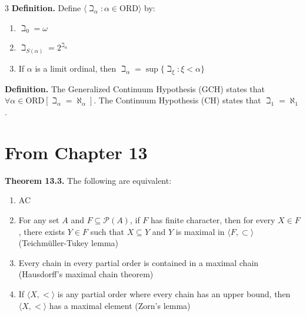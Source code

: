 \documentclass[landscape,8pt]{article}
\newcommand{\Pow}{\mathcal{P}}
\begin{document}
\begin{multicols}{3}
	\noindent\textbf{Definition.} Define $\langle \beth_\alpha : \alpha \in \text{ORD} \rangle$ by:
	\begin{enumerate}[noitemsep,topsep=0pt]
		\item $\beth_0 = \omega$
		\item $\beth_{S(\alpha)} = 2^{\beth_\alpha}$
		\item If $\alpha$ is a limit ordinal, then $\beth_\alpha = \sup\{\beth_\xi : \xi < \alpha\}$
	\end{enumerate}

	\noindent\textbf{Definition.} The Generalized Continuum Hypothesis (GCH) states that $\forall \alpha \in \text{ORD}[\beth_\alpha = \aleph_\alpha]$. The Continuum Hypothesis (CH) states that $\beth_1 = \aleph_1$.

	\section*{\centering From Chapter 13}

	\noindent\textbf{Theorem 13.3.} The following are equivalent:
	\begin{enumerate}[noitemsep,topsep=0pt]
		\item AC
		\item For any set $A$ and $F \subseteq \Pow(A)$, if $F$ has finite character, then for every $X \in F$, there exists $Y \in F$ such that $X \subseteq Y$ and $Y$ is maximal in $\langle F, \subset \rangle$ (Teichmüller-Tukey lemma)
		\item Every chain in every partial order is contained in a maximal chain (Hausdorff's maximal chain theorem)
		\item If $\langle X, < \rangle$ is any partial order where every chain has an upper bound, then $\langle X, < \rangle$ has a maximal element (Zorn's lemma)
	\end{enumerate}

\end{multicols}
\end{document}
